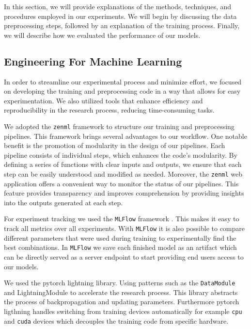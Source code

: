 
In this section, we will provide explanations of the methods, techniques, and procedures employed in our experiments. We will begin by discussing the data preprocessing steps, followed by an explanation of the training process. Finally, we will describe how we evaluated the performance of our models.

\subsection{Engineering For Machine Learning}
In order to streamline our experimental process and minimize effort,
we focused on developing the training and preprocessing code in a way that allows for easy experimentation.
We also utilized tools that enhance efficiency and reproducibility in the research process, reducing time-consuming tasks.
\medskip

We adopted the \texttt{zenml} \cite{zenml} framework to structure our training and preprocessing pipelines.
This framework brings several advantages to our workflow.
One notable benefit is the promotion of modularity in the design of our pipelines.
Each pipeline consists of individual steps, which enhances the code's modularity.
By defining a series of functions with clear inputs and outputs,
we ensure that each step can be easily understood and modified as needed.
Moreover, the \texttt{zenml} web application offers a convenient way to monitor the status of our pipelines.
This feature provides transparency and improves comprehension by providing insights into the outputs generated at each step.
\medskip

For experiment tracking we used the \texttt{MLFlow} framework \cite{mlflow}.
This makes it easy to track all metrics over all experiments.
With \texttt{MLFlow} it is also possible to compare different parameters that were used during training to experimentally find the best combinations.
In \texttt{MLFlow} we save each finished model as an artifact which can be directly served as a server endpoint to start providing end users access to our models.
\medskip

We used the pytorch lightning library. Using patterns such as the \texttt{DataModule} and {LightningModule} to accelerate the
research process. This library abstracts the process of backpropagation and updating parameters.
Furthermore pytorch ligthning \cite{lightning} handles
switching from training devices automatically for example \texttt{cpu} and \texttt{cuda} devices
which decouples the training code from specific hardware.

